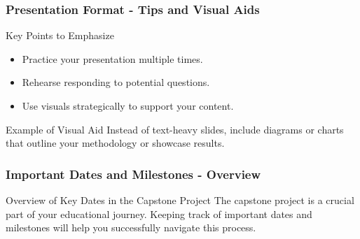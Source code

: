 \documentclass{beamer}
\begin{document}
\begin{frame}[fragile]
    \frametitle{Presentation Format - Tips and Visual Aids}
    \begin{block}{Key Points to Emphasize}
        \begin{itemize}
            \item Practice your presentation multiple times.
            \item Rehearse responding to potential questions.
            \item Use visuals strategically to support your content.
        \end{itemize}
    \end{block}
    
    \begin{block}{Example of Visual Aid}
        Instead of text-heavy slides, include diagrams or charts that outline your methodology or showcase results.
    \end{block}
\end{frame}

\begin{frame}[fragile]
    \frametitle{Important Dates and Milestones - Overview}
    \begin{block}{Overview of Key Dates in the Capstone Project}
        The capstone project is a crucial part of your educational journey. Keeping track of important dates and milestones will help you successfully navigate this process.
    \end{block}
\end{frame}
\end{document}
